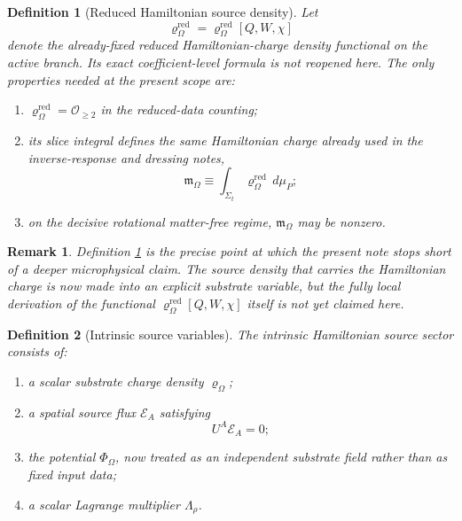 \documentclass[11pt]{article}
\newcommand{\FlowPot}{\Phi_\Omega}
\newcommand{\SourceDensity}{\varrho_\Omega}
\newcommand{\SourceDensityRed}{\varrho_\Omega^{\mathrm{red}}}
\newcommand{\SourceMult}{\Lambda_\rho}
\newcommand{\SourceFlux}{\mathcal E}
\newcommand{\HamChargeOmega}{\mathfrak m_\Omega}
\newtheorem{definition}{Definition}
\newtheorem{remark}{Remark}
\begin{document}
\begin{definition}[Reduced Hamiltonian source density]
\label{def:redsource}
Let
\begin{equation}
\SourceDensityRed=\SourceDensityRed[Q,W,\chi]
\label{eq:redsource}
\end{equation}
denote the already-fixed reduced Hamiltonian-charge density functional on the active branch. Its exact coefficient-level formula is not reopened here. The only properties needed at the present scope are:
\begin{enumerate}
    \item \(\SourceDensityRed=\mathcal O_{\ge 2}\) in the reduced-data counting;
    \item its slice integral defines the same Hamiltonian charge already used in the inverse-response and dressing notes,
    \begin{equation}
    \HamChargeOmega
    \equiv
    \int_{\Sigma_t}\SourceDensityRed\,d\mu_P;
    \label{eq:charge}
    \end{equation}
    \item on the decisive rotational matter-free regime, \(\HamChargeOmega\) may be nonzero.
\end{enumerate}
\end{definition}

\begin{remark}
Definition \ref{def:redsource} is the precise point at which the present note stops short of a deeper microphysical claim. The source density that carries the Hamiltonian charge is now made into an explicit substrate variable, but the fully local derivation of the functional \(\SourceDensityRed[Q,W,\chi]\) itself is not yet claimed here.
\end{remark}

\begin{definition}[Intrinsic source variables]
\label{def:sourcevars}
The \emph{intrinsic Hamiltonian source sector} consists of:
\begin{enumerate}
    \item a scalar substrate charge density \(\SourceDensity\);
    \item a spatial source flux \(\SourceFlux_A\) satisfying
    \begin{equation}
    U^A\SourceFlux_A=0;
    \label{eq:spatialflux}
    \end{equation}
    \item the potential \(\FlowPot\), now treated as an independent substrate field rather than as fixed input data;
    \item a scalar Lagrange multiplier \(\SourceMult\).
\end{enumerate}
\end{definition}
\end{document}
